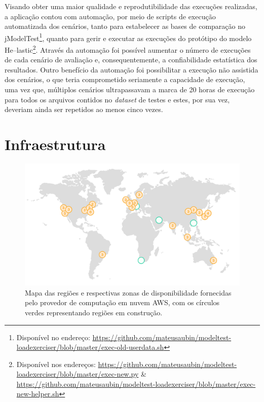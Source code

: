 \documentclass[english,brazilian]{UNISINOSmonografia} %
\newcommand\defaultFigureWidth{0.9}
\begin{document}
Visando obter uma maior qualidade e reprodutibilidade das execuções realizadas, a aplicação contou com automação, por meio de scripts de execução automatizada dos cenários, tanto para estabelecer as bases de comparação no jModelTest\footnote{Disponível no endereço: \url{https://github.com/mateusaubin/modeltest-loadexerciser/blob/master/exec-old-userdata.sh}}, quanto para gerir e executar as execuções do protótipo do modelo \textsf{He}--lastic\footnote{
	Disponível nos endereços: \url{https://github.com/mateusaubin/modeltest-loadexerciser/blob/master/exec-new.py}
	\&
	\url{https://github.com/mateusaubin/modeltest-loadexerciser/blob/master/exec-new-helper.sh}
}. 
Através da automação foi possível aumentar o número de execuções de cada cenário de avaliação e, consequentemente, a confiabilidade estatística dos resultados.
Outro benefício da automação foi possibilitar a execução não assistida dos cenários, o que teria comprometido seriamente a capacidade de execução, uma vez que, múltiplos cenários ultrapassavam a marca de 20 horas de execução para todos os arquivos contidos no \textit{dataset} de testes e estes, por sua vez, deveriam ainda ser repetidos ao menos cinco vezes.







\section{Infraestrutura}
\label{sec:metodologia-infra}


\begin{figure}[tb]
	\centering%
	\begin{minipage}{\defaultFigureWidth\textwidth}
		\caption{Mapa das regiões e respectivas zonas de disponibilidade fornecidas pelo provedor de computação em nuvem AWS, com os círculos verdes representando regiões em construção.}
		\label{fig:metodologia-infra-awsregions}
		\includegraphics[width=\textwidth]{aws-regions}
	\end{minipage}
\end{figure}
\end{document}
